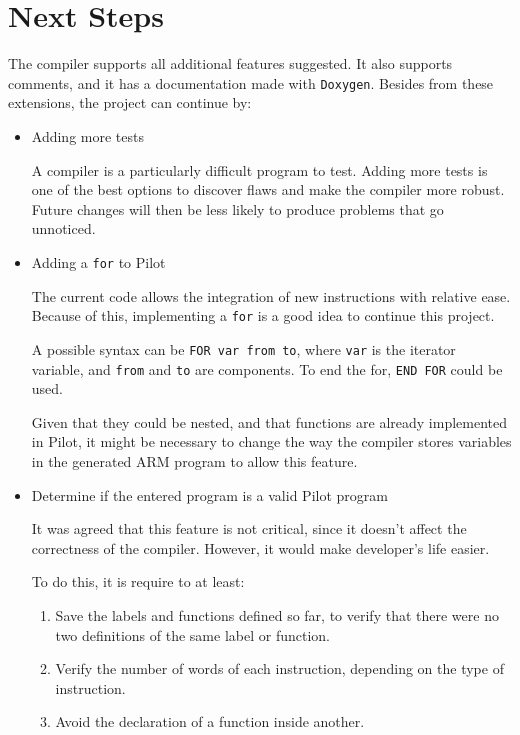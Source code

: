 \documentclass[12pt,spanish]{article}
\begin{document}
\section{Next Steps}
The compiler supports all additional features suggested. It also supports comments, and it has a documentation made with \texttt{Doxygen}.
Besides from these extensions, the project can continue by:
\begin{itemize}
\item{Adding more tests}

A compiler is a particularly difficult program to test. Adding more tests is one of the best options to discover flaws and make the compiler more robust. Future changes will then be less likely to produce problems that go unnoticed.

\item{Adding a \texttt{for} to Pilot}

The current code allows the integration of new instructions with relative ease. Because of this, implementing a \texttt{for} is a good idea to continue this project.

A possible syntax can be \texttt{FOR var from to}, where \texttt{var} is the iterator variable, and \texttt{from} and \texttt{to} are components. To end the for, \texttt{END FOR} could be used.

Given that they could be nested, and that functions are already implemented in Pilot, it might be necessary to change the way the compiler stores variables in the generated ARM program to allow this feature.

\item{Determine if the entered program is a valid Pilot program}

It was agreed that this feature is not critical, since it doesn't affect the correctness of the compiler. However, it would make developer's life easier.

To do this, it is require to at least:

\begin{enumerate}
\item{Save the labels and functions defined so far, to verify that there were no two definitions of the same label or function.}
\item{Verify the number of words of each instruction, depending on the type of instruction.}
\item{Avoid the declaration of a function inside another.}
\end{enumerate}

\end{itemize}
\end{document}
